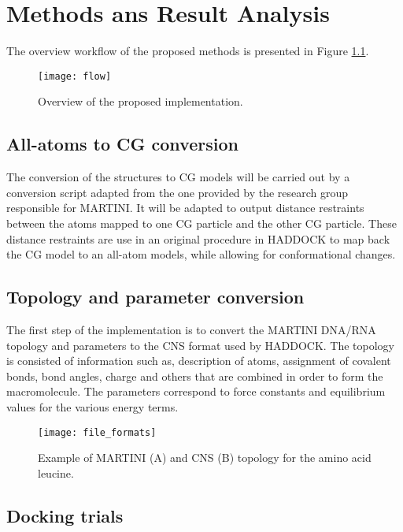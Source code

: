 \documentclass[
	12pt,				%
	openright,			%
	twoside,			%
	a4paper,			%
	english,			%
	french,				%
	spanish,			%
	brazil,				%
	]{abntex2}
\begin{document}
\chapter{Methods ans Result Analysis}


The overview workflow of the proposed methods is presented in Figure \ref{fig:flow}.

\begin{figure}[h]
	\centering
	\texttt{[image: flow]}
	\caption{Overview of the proposed implementation.}
	\label{fig:flow}
\end{figure}

\section{All-atoms to CG conversion}

The conversion of the structures to CG models will be carried out by a conversion script adapted from the one provided by the research group responsible for MARTINI. It will be adapted to output distance restraints between the atoms mapped to one CG particle and the other CG particle. These distance restraints are use in an original procedure in HADDOCK to map back the CG model to an all-atom models, while allowing for conformational changes.

\section{Topology and parameter conversion}

The first step of the implementation is to convert the MARTINI DNA/RNA topology and parameters to the CNS format used by HADDOCK. The topology is consisted of information such as, description of atoms, assignment of covalent bonds, bond angles, charge and others that are combined in order to form the macromolecule. The parameters correspond to force constants and equilibrium values for the various energy terms.

\begin{figure}
	\centering
	\texttt{[image: file\_formats]}
	\caption{Example of MARTINI (A) and CNS (B) topology for the amino acid leucine.}
	\label{fig:fileformats}
\end{figure}

\section{Docking trials}
\end{document}
